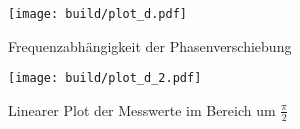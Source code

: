 \begin{figure} [H]
  \centering
  \texttt{[image: build/plot\_d.pdf]}
  \caption{Frequenzabhängigkeit der Phasenverschiebung}
  \label{fig:plot_d}
\end{figure}

\begin{figure} [H]
  \centering
  \texttt{[image: build/plot\_d\_2.pdf]}
  \caption{Linearer Plot der Messwerte im Bereich um $\frac{\pi}{2}$}
  \label{fig:plot_d_2}
\end{figure}